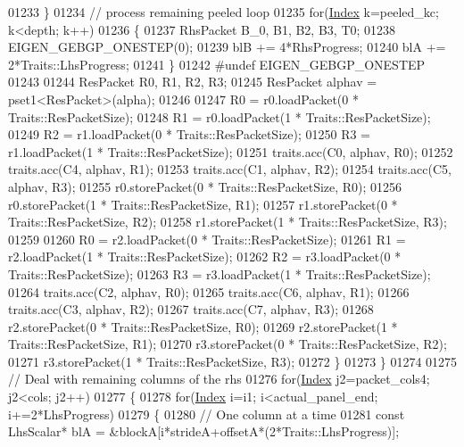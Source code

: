 \begin{DoxyCode}
01233           \}
01234           \textcolor{comment}{// process remaining peeled loop}
01235           \textcolor{keywordflow}{for}(\hyperlink{namespace_eigen_a62e77e0933482dafde8fe197d9a2cfde}{Index} k=peeled\_kc; k<depth; k++)
01236           \{
01237             RhsPacket B\_0, B1, B2, B3, T0;
01238             EIGEN\_GEBGP\_ONESTEP(0);
01239             blB += 4*RhsProgress;
01240             blA += 2*Traits::LhsProgress;
01241           \}
01242 \textcolor{preprocessor}{#undef EIGEN\_GEBGP\_ONESTEP}
01243 
01244           ResPacket R0, R1, R2, R3;
01245           ResPacket alphav = pset1<ResPacket>(alpha);
01246 
01247           R0 = r0.loadPacket(0 * Traits::ResPacketSize);
01248           R1 = r0.loadPacket(1 * Traits::ResPacketSize);
01249           R2 = r1.loadPacket(0 * Traits::ResPacketSize);
01250           R3 = r1.loadPacket(1 * Traits::ResPacketSize);
01251           traits.acc(C0, alphav, R0);
01252           traits.acc(C4, alphav, R1);
01253           traits.acc(C1, alphav, R2);
01254           traits.acc(C5, alphav, R3);
01255           r0.storePacket(0 * Traits::ResPacketSize, R0);
01256           r0.storePacket(1 * Traits::ResPacketSize, R1);
01257           r1.storePacket(0 * Traits::ResPacketSize, R2);
01258           r1.storePacket(1 * Traits::ResPacketSize, R3);
01259 
01260           R0 = r2.loadPacket(0 * Traits::ResPacketSize);
01261           R1 = r2.loadPacket(1 * Traits::ResPacketSize);
01262           R2 = r3.loadPacket(0 * Traits::ResPacketSize);
01263           R3 = r3.loadPacket(1 * Traits::ResPacketSize);
01264           traits.acc(C2,  alphav, R0);
01265           traits.acc(C6,  alphav, R1);
01266           traits.acc(C3,  alphav, R2);
01267           traits.acc(C7,  alphav, R3);
01268           r2.storePacket(0 * Traits::ResPacketSize, R0);
01269           r2.storePacket(1 * Traits::ResPacketSize, R1);
01270           r3.storePacket(0 * Traits::ResPacketSize, R2);
01271           r3.storePacket(1 * Traits::ResPacketSize, R3);
01272           \}
01273         \}
01274       
01275         \textcolor{comment}{// Deal with remaining columns of the rhs}
01276         \textcolor{keywordflow}{for}(\hyperlink{namespace_eigen_a62e77e0933482dafde8fe197d9a2cfde}{Index} j2=packet\_cols4; j2<cols; j2++)
01277         \{
01278           \textcolor{keywordflow}{for}(\hyperlink{namespace_eigen_a62e77e0933482dafde8fe197d9a2cfde}{Index} i=i1; i<actual\_panel\_end; i+=2*LhsProgress)
01279           \{
01280           \textcolor{comment}{// One column at a time}
01281           \textcolor{keyword}{const} LhsScalar* blA = &blockA[i*strideA+offsetA*(2*Traits::LhsProgress)];

\end{DoxyCode}
